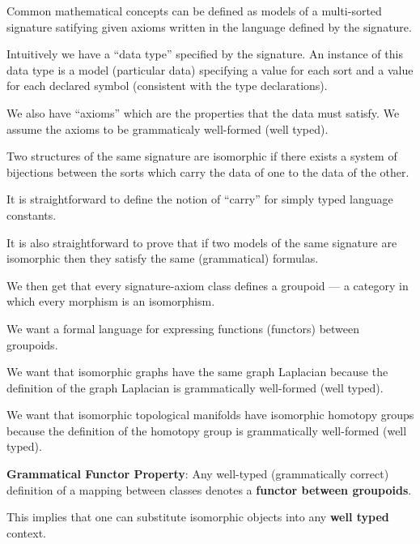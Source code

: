 {

Common mathematical concepts can be defined as models of a multi-sorted signature satifying given axioms written in the language defined
by the signature.

\vfill
Intuitively we have a ``data type'' specified by the signature.  An instance of this data type is a model
(particular data) specifying a value for each sort
and a value for each declared symbol (consistent with the type declarations).

\vfill
We also have ``axioms'' which are the properties that the data must satisfy.  We assume the axioms to be grammaticaly well-formed (well typed).


Two structures of the same signature are isomorphic if there exists a system of bijections between the sorts which carry the data of one to the data of the other.

\vfill
It is straightforward to define the notion of ``carry'' for simply typed language constants.


\vfill
It is also straightforward to prove that
if two models of the same signature are isomorphic then they satisfy the same (grammatical) formulas.

\vfill
We then get that every signature-axiom class defines a groupoid --- a category in which every morphism is an isomorphism.


We want a formal language for expressing functions (functors) between groupoids.

\vfill
We want that isomorphic graphs have the same graph Laplacian because the definition of the graph Laplacian is grammatically well-formed (well typed).

\vfill
We want that isomorphic topological manifolds have isomorphic homotopy groups because the definition of the homotopy group is grammatically well-formed (well typed).


{\bf Grammatical Functor Property}: Any well-typed (grammatically correct) definition of a mapping between classes denotes a {\bf functor between groupoids}.

\vfill
This implies that one can substitute isomorphic objects into any {\bf well typed} context.

\vfill

}
